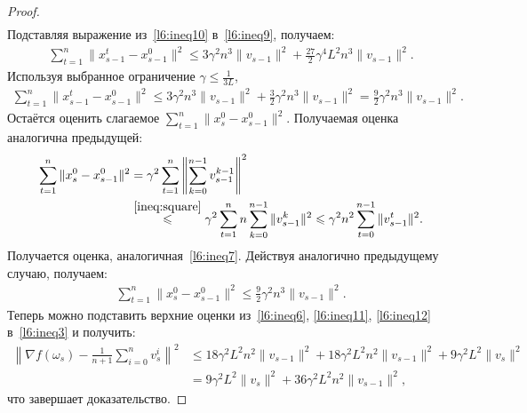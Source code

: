 \begin{lemma}
\begin{proof}
\begin{align}
\end{align}
Подставляя выражение из~\eqref{l6:ineq10} в~\eqref{l6:ineq9}, получаем:
\begin{align*}
    \sum\limits_{t=1}^n \|x_{s-1}^t - x_{s-1}^0\|^2 \leqslant 3\gamma^2 n^3 \|v_{s-1}\|^2 + \frac{27}{2}\gamma^4L^2 n^3\|v_{s-1}\|^2.
\end{align*}
Используя выбранное ограничение \(\gamma \leqslant \frac{1}{3L}\),
\begin{align}
\label{l6:ineq11}
    \sum\limits_{t=1}^n \|x_{s-1}^t - x_{s-1}^0\|^2 \leqslant 3\gamma^2 n^3 \|v_{s-1}\|^2 + \frac{3}{2}\gamma^2 n^3\|v_{s-1}\|^2 = \frac{9}{2}\gamma^2 n^3\|v_{s-1}\|^2.
\end{align}
Остаётся оценить слагаемое \(\sum\limits_{t=1}^n\|x_s^0 - x_{s-1}^0\|^2\). Получаемая оценка аналогична предыдущей:
\begin{align*}            
    \sum\limits_{t=1}^n \|x_s^0 - x_{s-1}^0\|^2  & = \gamma^2\sum\limits_{t=1}^n \left\|\sum\limits_{k = 0}^{n-1} v_{s-1}^{k-1}\right\|^2 \\ &\overset{\eqref{ineq:square}}{\leqslant} \gamma^2\sum\limits_{t=1}^n n \sum\limits_{k = 0}^{n-1} \|v_{s-1}^k\|^2 \leqslant \gamma^2 n^2 \sum\limits_{t = 0}^{n-1}  \|v_{s-1}^t\|^2. 
\end{align*}
Получается оценка, аналогичная~\eqref{l6:ineq7}. Действуя аналогично предыдущему случаю, получаем:
\begin{align}
\label{l6:ineq12}
    \sum\limits_{t=1}^n \|x_{s}^0 - x_{s-1}^0\|^2 \leqslant \frac{9}{2}\gamma^2 n^3\|v_{s-1}\|^2.
\end{align}
Теперь можно подставить верхние оценки из~\eqref{l6:ineq6}, \eqref{l6:ineq11}, \eqref{l6:ineq12} в~\eqref{l6:ineq3} и получить:
\begin{align*}
    \left\| \nabla f(\omega_s) - \frac{1}{n+1} \sum\limits_{i=0}^n v_s^i\right\|^2 & \leqslant 18\gamma^2L^2n^2\|v_{s-1}\|^2 + 18\gamma^2L^2n^2\|v_{s-1}\|^2 + 9\gamma^2L^2\|v_s\|^2 \\
    & = 9\gamma^2L^2\|v_{s}\|^2 + 36\gamma^2L^2n^2\|v_{s-1}\|^2,
\end{align*}
что завершает доказательство.
\end{proof}
\end{lemma}

